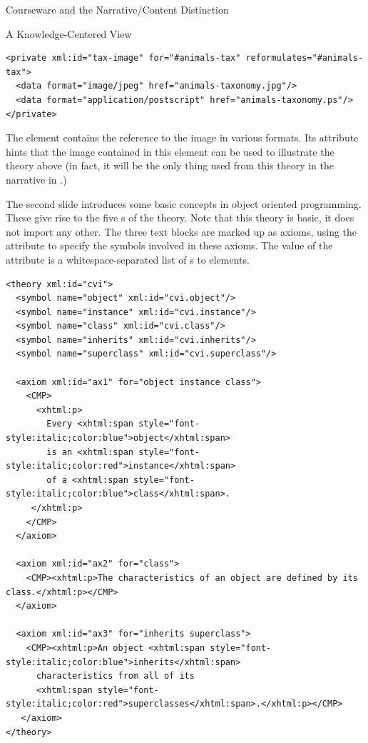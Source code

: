 \begin{tchapter}[id=courseware]{Courseware and the Narrative/Content Distinction}
\begin{tsection}[id=knowledge-centered]{A Knowledge-Centered View}
\begin{lstlisting}[label=lst:ann-tax,mathescape,
    caption={The {\omdoc} Representation for Slide 1 from {\myfigref{15-211}}},
    index={theory,axiom,symbol,CMP,FMP,OMA,OMOBJ,OMS,private,data}]
<private xml:id="tax-image" for="#animals-tax" reformulates="#animals-tax">
  <data format="image/jpeg" href="animals-taxonomy.jpg"/>
  <data format="application/postscript" href="animals-taxonomy.ps"/>
</private>
\end{lstlisting}
The {} element contains the reference to the image in various
formats. Its {} attribute hints that the image
contained in this element can be used to illustrate the theory above (in fact, it
will be the only thing used from this theory in the narrative {\omdoc} in
{}.)

The second slide introduces some basic concepts in object oriented programming.  These
give rise to the five {s} of the theory. Note that this theory
is basic, it does not import any other. The three text blocks are marked up as axioms,
using the attribute {} to specify the symbols involved in these
axioms. The value of the {} attribute is a whitespace-separated list
of {s} to {} elements.

\begin{lstlisting}[label=lst:ann-oo,
    caption={The {\omdoc} Representation for Slide 2 from {\myfigref{15-211}}},
    index={theory,axiom,symbol,CMP,FMP,OMA,OMOBJ,OMS}]
<theory xml:id="cvi">
  <symbol name="object" xml:id="cvi.object"/>
  <symbol name="instance" xml:id="cvi.instance"/>
  <symbol name="class" xml:id="cvi.class"/>
  <symbol name="inherits" xml:id="cvi.inherits"/>
  <symbol name="superclass" xml:id="cvi.superclass"/>

  <axiom xml:id="ax1" for="object instance class">
    <CMP>
      <xhtml:p>
        Every <xhtml:span style="font-style:italic;color:blue">object</xhtml:span>
        is an <xhtml:span style="font-style:italic;color:red">instance</xhtml:span> 
        of a <xhtml:span style="font-style:italic;color:blue">class</xhtml:span>.
     </xhtml:p>
    </CMP>
  </axiom>

  <axiom xml:id="ax2" for="class">
    <CMP><xhtml:p>The characteristics of an object are defined by its class.</xhtml:p></CMP>
  </axiom>

  <axiom xml:id="ax3" for="inherits superclass">
    <CMP><xhtml:p>An object <xhtml:span style="font-style:italic;color:blue">inherits</xhtml:span>
      characteristics from all of its 
      <xhtml:span style="font-style:italic;color:red">superclasses</xhtml:span>.</xhtml:p></CMP>
   </axiom>
</theory>
\end{lstlisting}


\end{tsection}
\end{tchapter}
